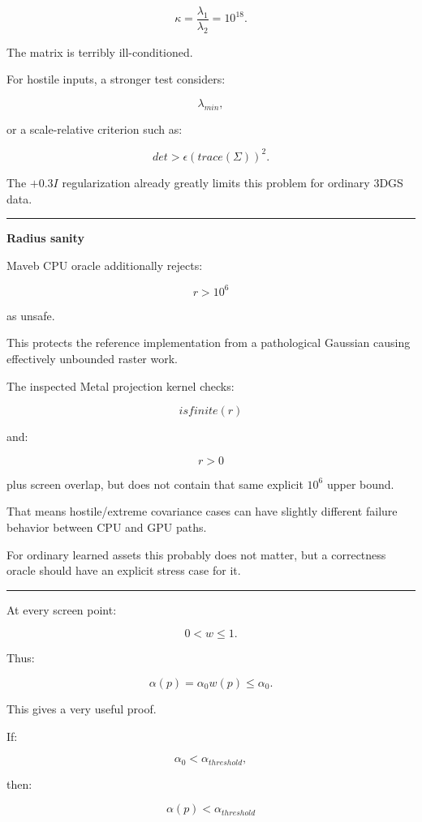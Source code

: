 \[
\kappa=
\frac{\lambda_1}{\lambda_2}
=
10^{18}.
\]

The matrix is terribly ill-conditioned.

For hostile inputs, a stronger test considers:

\[
\lambda_{min},
\]

or a scale-relative criterion such as:

\[
\boxed{
det
>
\epsilon
(trace(\Sigma))^2.
}
\]

The \(+0.3I\) regularization already greatly limits this problem for ordinary 3DGS data.

\begin{center}\rule{0.5\linewidth}{0.5pt}\end{center}

\textbf{Radius sanity}

Maveb CPU oracle additionally rejects:

\[
r>10^6
\]

as unsafe.

This protects the reference implementation from a pathological Gaussian causing effectively unbounded raster work.

The inspected Metal projection kernel checks:

\[
isfinite(r)
\]

and:

\[
r>0
\]

plus screen overlap, but does not contain that same explicit \(10^6\) upper bound.

That means hostile/extreme covariance cases can have slightly different failure behavior between CPU and GPU paths.

For ordinary learned assets this probably does not matter, but a correctness oracle should have an explicit stress case for it.

\begin{center}\rule{0.5\linewidth}{0.5pt}\end{center}

At every screen point:

\[
0<w\le1.
\]

Thus:

\[
\alpha(p)
=
\alpha_0w(p)
\le
\alpha_0.
\]

This gives a very useful proof.

If:

\[
\alpha_0<\alpha_{threshold},
\]

then:

\[
\alpha(p)
<
\alpha_{threshold}
\]

